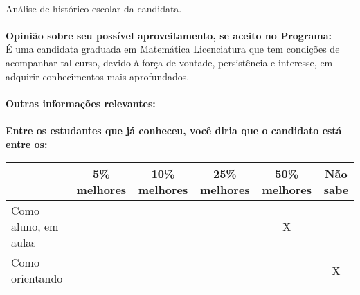 \documentclass[11pt]{article}
\begin{document}
\\Análise de histórico escolar da candidata.\\
\\
\textbf{Opinião sobre seu possível aproveitamento, se aceito no Programa:}
\\É uma candidata graduada em Matemática Licenciatura que tem condições de acompanhar tal curso, devido à força de vontade, persistência e interesse, em adquirir conhecimentos mais aprofundados. \\ 
\\
\textbf{Outras informações relevantes:} \\
\\[0.3cm]
\textbf{Entre os estudantes que já conheceu, você diria que o candidato está entre os:}
\\
\begin{tabular}{|l|c|c|c|c|c|}
\hline
 & 5\% melhores & 10\% melhores & 25\% melhores & 50\% melhores & Não sabe \\
\hline
Como aluno, em aulas &  &  &  & X & \\
\hline
Como orientando &  &  &  &  & X\\
\hline
\end{tabular}
\end{document}
